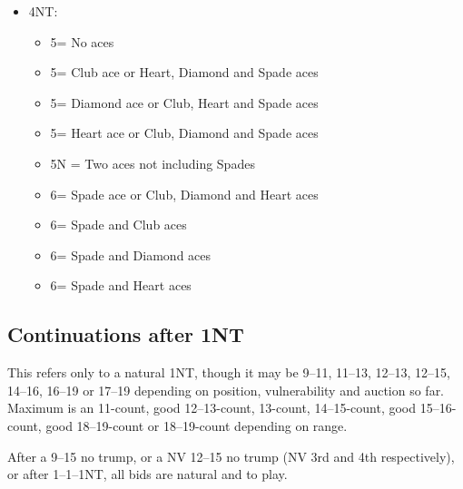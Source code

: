 \documentclass[a4paper,14pt]{extarticle}
\begin{document}
\begin{itemize}
\item 4NT:
	\begin{itemize}
	\item 5\clubs = No aces
	\item 5\diamonds = Club ace or Heart, Diamond and Spade aces
	\item 5\hearts = Diamond ace or Club, Heart and Spade aces
	\item 5\spades = Heart ace or Club, Diamond and Spade aces
	\item 5N = Two aces not including Spades
	\item 6\clubs = Spade ace or Club, Diamond and Heart aces
	\item 6\diamonds = Spade and Club aces
	\item 6\hearts = Spade and Diamond aces
	\item 6\spades = Spade and Heart aces
	\end{itemize}

\end{itemize}

\newpage

\subsection{Continuations after 1NT}
\label{sec:resp:1n}


This refers only to a natural 1NT, though it may be 9--11, 11--13, 12--13,
12--15, 14--16, 16--19 or 17--19 depending on position, vulnerability and
auction so far.  Maximum is an 11-count, good 12--13-count, 13-count,
14--15-count, good 15--16-count, good 18--19-count or 18--19-count depending on
range.

After a 9--15 no trump, or a NV 12--15 no trump (NV 3rd and 4th respectively),
or after 1\clubs--1\diamonds--1NT, all bids are natural and to play.
\end{document}
